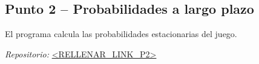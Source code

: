 \subsection{Punto 2 – Probabilidades a largo plazo}
El programa calcula las probabilidades estacionarias del juego.

\vspace{0.3em}
\noindent\emph{Repositorio:} \url{<RELLENAR_LINK_P2>}
